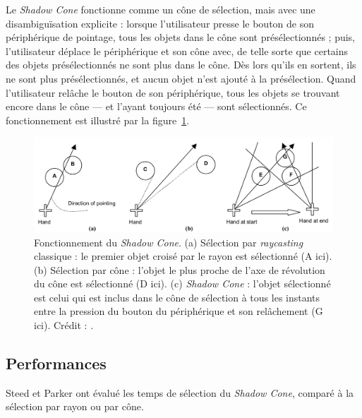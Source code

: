 	Le \emph{Shadow Cone} fonctionne comme un cône de sélection, mais avec une disambiguïsation explicite : lorsque l'utilisateur presse le bouton de son périphérique de pointage, tous les objets dans le cône sont présélectionnés ; puis, l'utilisateur déplace le périphérique et son cône avec, de telle sorte que certains des objets présélectionnés ne sont plus dans le cône. Dès lors qu'ils en sortent, ils ne sont plus présélectionnés, et aucun objet n'est ajouté à la présélection. Quand l'utilisateur relâche le bouton de son périphérique, tous les objets se trouvant encore dans le cône --- et l'ayant toujours été --- sont sélectionnés. Ce fonctionnement est illustré par la figure~\ref{fig:shadow}.
	
	\begin{figure}[H]
		\centering
		\includegraphics[width=\textwidth]{figures/ch2/shadow}
		\caption[Fonctionnement du \emph{Shadow Cone}]{Fonctionnement du \emph{Shadow Cone}. (a) Sélection par \emph{raycasting} classique : le premier objet croisé par le rayon est sélectionné (A ici). (b) Sélection par cône : l'objet le plus proche de l'axe de révolution du cône est sélectionné (D ici). (c) \emph{Shadow Cone} : l'objet sélectionné est celui qui est inclus dans le cône de sélection à tous les instants entre la pression du bouton du périphérique et son relâchement (G ici). Crédit : \cite{steed20043d}.}
		\label{fig:shadow}
	\end{figure}
	
	\subsection{Performances}
	Steed et Parker ont évalué les temps de sélection du \emph{Shadow Cone}, comparé à la sélection par rayon ou par cône.
	
